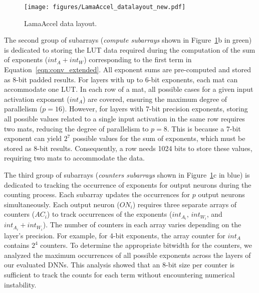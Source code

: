 \begin{figure}[t!]
\centering
\texttt{[image: figures/LamaAccel\_datalayout\_new.pdf]}
\caption{LamaAccel data layout.}
\label{fig:LamaAccel_datalayout}
\vskip -0.15in
\end{figure}

The second group of subarrays (\textit{compute subarrays} shown in Figure~\ref{fig:LamaAccel_datalayout}b in green) is dedicated to storing the LUT data required during the computation of the sum of exponents ($int_{A} + int_{W}$) corresponding to the first term in Equation~\ref{eqn:conv_extended}. All exponent sums are pre-computed and stored as 8-bit padded results. For layers with up to 6-bit exponents, each mat can accommodate one LUT. In each row of a mat, all possible cases for a given input activation exponent ($int_{A}$) are covered, ensuring the maximum degree of parallelism ($p=16$). However, for layers with 7-bit precision exponents, storing all possible values related to a single input activation in the same row requires two mats, reducing the degree of parallelism to $p=8$. This is because a 7-bit exponent can yield $2^7$ possible values for the sum of exponents, which must be stored as 8-bit results. Consequently, a row needs 1024 bits to store these values, requiring two mats to accommodate the data.

The third group of subarrays (\textit{counters subarrays} shown in Figure~\ref{fig:LamaAccel_datalayout}c in blue) is dedicated to tracking the occurrence of exponents for output neurons during the counting process. Each subarray updates the occurrences for $p$ output neurons simultaneously. Each output neuron ($ON_{i}$) requires three separate arrays of counters ($AC_{i}$) to track occurrences of the exponents ($int_{A_{i}}$, $int_{W_{i}}$, and $int_{A_{i}} + int_{W_{i}}$). The number of counters in each array varies depending on the layer's precision. For example, for 4-bit exponents, the array counter for $int_{A}$ contains $2^4$ counters. To determine the appropriate bitwidth for the counters, we analyzed the maximum occurrences of all possible exponents across the layers of our evaluated DNNs. This analysis showed that an 8-bit size per counter is sufficient to track the counts for each term without encountering numerical instability.



